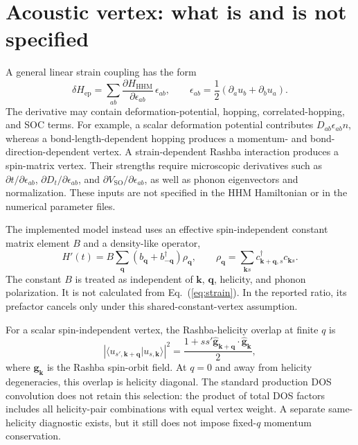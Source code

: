 \documentclass[aps,prb,reprint,superscriptaddress]{revtex4-2}
\begin{document}
\section{Acoustic vertex: what is and is not specified}

A general linear strain coupling has the form
\begin{equation}
 \delta H_{\mathrm{ep}}=\sum_{ab}\frac{\partial H_{\mathrm{HHM}}}{\partial\epsilon_{ab}}\,\epsilon_{ab},\qquad
 \epsilon_{ab}=\frac12(\partial_a u_b+\partial_b u_a).
 \label{eq:strain}
\end{equation}
The derivative may contain deformation-potential, hopping, correlated-hopping, and SOC terms. For example, a scalar deformation potential contributes $D_{ab}\epsilon_{ab}n$, whereas a bond-length-dependent hopping produces a momentum- and bond-direction-dependent vertex. A strain-dependent Rashba interaction produces a spin-matrix vertex. Their strengths require microscopic derivatives such as $\partial t/\partial\epsilon_{ab}$, $\partial D_t/\partial\epsilon_{ab}$, and $\partial V_{\mathrm{SO}}/\partial\epsilon_{ab}$, as well as phonon eigenvectors and normalization. These inputs are not specified in the HHM Hamiltonian or in the numerical parameter files.

The implemented model instead uses an effective spin-independent constant matrix element $B$ and a density-like operator,
\begin{equation}
 H'(t)=B\sum_{\bm q}(b_{\bm q}+b^\dagger_{-\bm q})\rho_{\bm q},\qquad
 \rho_{\bm q}=\sum_{\bm k s}c^\dagger_{\bm{k+q},s}c_{\bm k s}.
 \label{eq:phenom-vertex}
\end{equation}
The constant $B$ is treated as independent of $\bm k$, $\bm q$, helicity, and phonon polarization. It is not calculated from Eq.~(\ref{eq:strain}). In the reported ratio, its prefactor cancels only under this shared-constant-vertex assumption.

For a scalar spin-independent vertex, the Rashba-helicity overlap at finite $q$ is
\begin{equation}
 \left|\langle u_{s',\bm{k+q}}|u_{s,\bm k}\rangle\right|^2
 =\frac{1+ss'\widehat{\bm g}_{\bm{k+q}}\cdot\widehat{\bm g}_{\bm k}}{2},
 \label{eq:helicity-overlap}
\end{equation}
where $\bm g_{\bm k}$ is the Rashba spin-orbit field. At $q=0$ and away from helicity degeneracies, this overlap is helicity diagonal. The standard production DOS convolution does not retain this selection: the product of total DOS factors includes all helicity-pair combinations with equal vertex weight. A separate same-helicity diagnostic exists, but it still does not impose fixed-$q$ momentum conservation.
\end{document}
